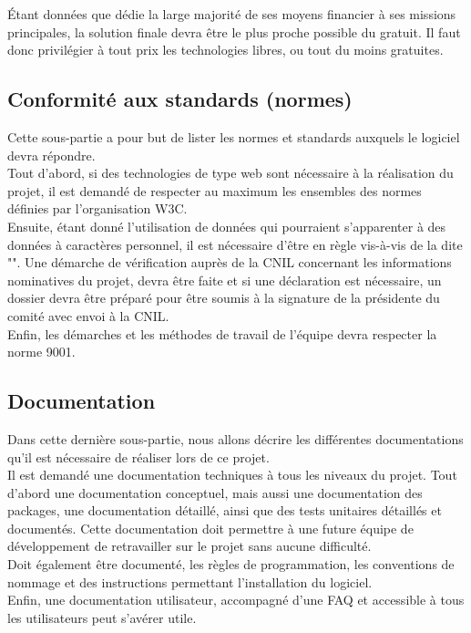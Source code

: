 Étant données que \nomClient{} dédie la large majorité de ses moyens financier à ses missions principales, la solution finale devra être le plus proche possible du gratuit. Il faut donc privilégier à tout prix les technologies libres, ou tout du moins gratuites.


\subsection{Conformité aux standards (normes)}
Cette sous-partie a pour but de lister les normes et standards auxquels le logiciel devra répondre.\\

Tout d'abord, si des technologies de type web sont nécessaire à la réalisation du projet, il est demandé de respecter au maximum les ensembles des normes définies par l'organisation W3C.\\

Ensuite, étant donné l'utilisation de données qui pourraient s'apparenter à des données à caractères personnel, il est nécessaire d'être en règle vis-à-vis de la \loiInfoLib{} dite "\loiInfoLibCourt{}". Une démarche de vérification auprès de la CNIL concernant les informations nominatives du projet, devra être faite et si une déclaration est nécessaire, un dossier devra être préparé pour être soumis à la signature de la présidente du comité avec envoi à la CNIL.\\

Enfin, les démarches et les méthodes de travail de l'équipe \PICCourt{} devra respecter la norme \ISOCourt{} 9001.

\subsection{Documentation}
\label{doc}
Dans cette dernière sous-partie, nous allons décrire les différentes documentations qu'il est nécessaire de réaliser lors de ce projet.\\

Il est demandé une documentation techniques à tous les niveaux du projet. Tout d'abord une documentation conceptuel, mais aussi une documentation des packages, une documentation détaillé, ainsi que des tests unitaires détaillés et documentés. Cette documentation doit permettre à une future équipe de développement de retravailler sur le projet sans aucune difficulté.\\

Doit également être documenté, les règles de programmation, les conventions de nommage et des instructions permettant l'installation du logiciel.\\

Enfin, une documentation utilisateur, accompagné d'une FAQ et accessible à tous les utilisateurs peut s'avérer utile.